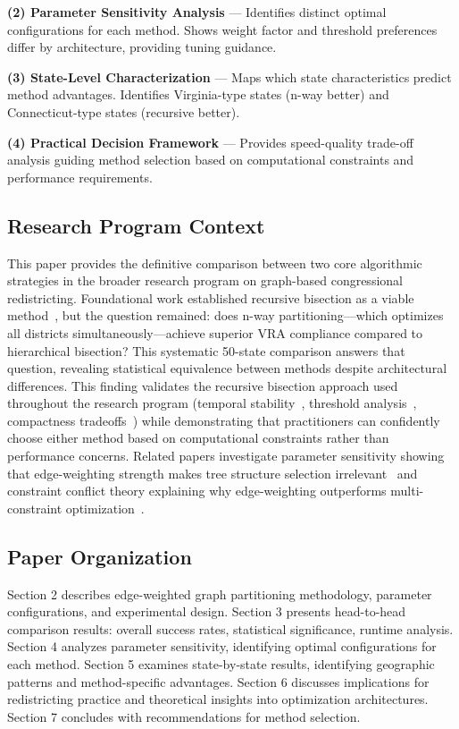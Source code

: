 \textbf{(2) Parameter Sensitivity Analysis} — Identifies distinct optimal configurations for each method. Shows weight factor and threshold preferences differ by architecture, providing tuning guidance.

\textbf{(3) State-Level Characterization} — Maps which state characteristics predict method advantages. Identifies Virginia-type states (n-way better) and Connecticut-type states (recursive better).

\textbf{(4) Practical Decision Framework} — Provides speed-quality trade-off analysis guiding method selection based on computational constraints and performance requirements.

\subsection{Research Program Context}

This paper provides the definitive comparison between two core algorithmic strategies in the broader research program on graph-based congressional redistricting. Foundational work established recursive bisection as a viable method~\cite{della-libera-recursive-bisection,della-libera-edge-weighted}, but the question remained: does n-way partitioning—which optimizes all districts simultaneously—achieve superior VRA compliance compared to hierarchical bisection? This systematic 50-state comparison answers that question, revealing statistical equivalence between methods despite architectural differences. This finding validates the recursive bisection approach used throughout the research program (temporal stability~\cite{della-libera-temporal-stability}, threshold analysis~\cite{della-libera-threshold-analysis}, compactness tradeoffs~\cite{della-libera-compactness-tradeoff}) while demonstrating that practitioners can confidently choose either method based on computational constraints rather than performance concerns. Related papers investigate parameter sensitivity showing that edge-weighting strength makes tree structure selection irrelevant~\cite{della-libera-adaptive-bisection} and constraint conflict theory explaining why edge-weighting outperforms multi-constraint optimization~\cite{della-libera-multi-vs-edge}.

\subsection{Paper Organization}

Section 2 describes edge-weighted graph partitioning methodology, parameter configurations, and experimental design. Section 3 presents head-to-head comparison results: overall success rates, statistical significance, runtime analysis. Section 4 analyzes parameter sensitivity, identifying optimal configurations for each method. Section 5 examines state-by-state results, identifying geographic patterns and method-specific advantages. Section 6 discusses implications for redistricting practice and theoretical insights into optimization architectures. Section 7 concludes with recommendations for method selection.
